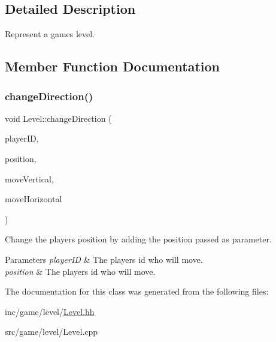 \subsection{Detailed Description}
Represent a game\textquotesingle{}s level. 

\subsection{Member Function Documentation}
\mbox{\label{classLevel_a7fbf2259277a0be256738886cd82796a}} 
\subsubsection{\texorpdfstring{change\+Direction()}{changeDirection()}}
{\footnotesize\ttfamily void Level\+::change\+Direction (\begin{DoxyParamCaption}\item[{const Unsigned\+Int \&}]{player\+ID,  }\item[{const Vector3d \&}]{position,  }\item[{Float}]{move\+Vertical,  }\item[{Float}]{move\+Horizontal }\end{DoxyParamCaption})}



Change the player\textquotesingle{}s position by adding the position passed as parameter. 


\begin{DoxyParams}{Parameters}
{\em player\+ID} & The player\textquotesingle{}s id who will move. \\
\hline
{\em position} & The player\textquotesingle{}s id who will move. \\
\hline
\end{DoxyParams}


The documentation for this class was generated from the following files\+:\begin{DoxyCompactItemize}
\item 
inc/game/level/\hyperlink{Level_8hh}{Level.\+hh}\item 
src/game/level/Level.\+cpp\end{DoxyCompactItemize}

